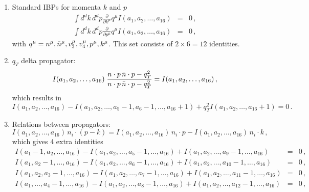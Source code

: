 \documentclass[a4paper,11pt]{article}
\numberwithin{equation}{section}
\begin{document}
\begin{enumerate}
  \item
  Standard IBPs for momenta $k$ and $p$
  \begin{eqnarray}
    \int d^dk\, d^d p \frac{\partial}{\partial k^\mu} q^\mu 
    I(a_1,a_2,\ldots, a_{16}) & = & 0\,, \\
    \int d^dk\, d^d p \frac{\partial}{\partial p^\mu} q^\mu 
    I(a_1,a_2,\ldots, a_{16}) & = & 0\,,
  \end{eqnarray}
  with $q^\mu = n^\mu, \bar{n}^\mu, v_3^\mu, v_4^\mu, p^\mu, k^\mu$. This set
  consists of $2 \times 6 = 12$ identities.
  \item
  $q_T$ delta propagator:
  \begin{equation}
    I(a_1,a_2,\ldots, a_{16})\;
    \frac{n\cdot p\, \bar{n} \cdot p - q_T^2}{n\cdot p\, \bar{n} \cdot p - q_T^2}
     = I(a_1,a_2,\ldots, a_{16})\,,
  \end{equation}
  which results in 
  \begin{equation}
     I(a_1,a_2,\ldots, a_{16}) - I(a_1,a_2,\ldots, a_5-1, a_6-1, \ldots, a_{16}+1)
     + q_T^2 I(a_1,a_2, \ldots, a_{16}+1) = 0\,.
  \end{equation}
  \item
  Relations between propagators:
  \begin{equation}
    I(a_1,a_2,\ldots, a_{16})\, n_i \cdot (p-k) = 
    I(a_1,a_2,\ldots, a_{16})\, n_i \cdot p - 
    I(a_1,a_2,\ldots, a_{16})\, n_i \cdot k\,,
  \end{equation}
  which gives 4 extra identities
  \begin{eqnarray}
    I(a_1-1,a_2,\ldots, a_{16}) -
    I(a_1,a_2,\ldots, a_5-1, \ldots, a_{16}) + 
    I(a_1,a_2,\ldots, a_9-1, \ldots, a_{16}) & = & 0\,,
    \nonumber \\
    I(a_1,a_2-1,\ldots, a_{16}) -
    I(a_1,a_2,\ldots, a_6-1, \ldots, a_{16}) + 
    I(a_1,a_2,\ldots, a_{10}-1, \ldots, a_{16}) & = & 0\,,
    \nonumber \\
    I(a_1,a_2,a_3-1, \ldots, a_{16}) -
    I(a_1,a_2,\ldots, a_7-1, \ldots, a_{16}) + 
    I(a_1,a_2,\ldots, a_{11}-1, \ldots, a_{16}) & = & 0\,,
    \nonumber \\
    I(a_1,\ldots,a_4-1,\ldots, a_{16}) -
    I(a_1,a_2,\ldots, a_8-1, \ldots, a_{16}) + 
    I(a_1,a_2,\ldots, a_{12}-1, \ldots, a_{16}) & = & 0\,,
    \nonumber \\
  \end{eqnarray}

\end{enumerate}
\end{document}
